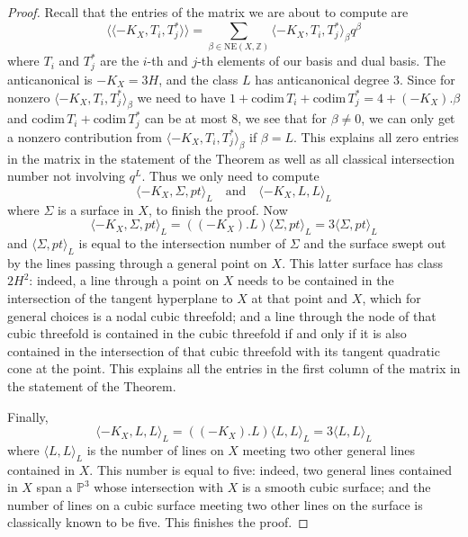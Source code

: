 \documentclass[11pt]{amsart}
\theoremstyle{plain}
\numberwithin{equation}{section}
\theoremstyle{definition}
\theoremstyle{remark}
\newcommand{\Z}{\mathbb Z}
\renewcommand{\P}{\mathbb P}
\begin{document}
\begin{proof}
Recall that the entries of the matrix we are about to compute are
\[
\langle\langle -K_X, T_i, T_j^* \rangle \rangle = \sum_{\beta \in \mathrm{NE}(X, \Z)} \langle -K_X, T_i, T_j^* \rangle_{\beta} q^\beta
\]
where $T_i$ and $T_j^*$ are the $i$-th and $j$-th elements of our basis and dual basis. The anticanonical is $-K_X =3H$, and the class $L$ has anticanonical degree $3$. Since for nonzero $\langle -K_X, T_i, T_j^* \rangle_{\beta}$ we need to have $1 + \mathrm{codim}\, T_i + \mathrm{codim}\, T_j^* = 4 + (-K_X).\beta$ and $\mathrm{codim}\, T_i + \mathrm{codim}\, T_j^*$ can be at most $8$, we see that for $\beta \neq 0$, we can only get a nonzero contribution from $\langle -K_X, T_i, T_j^* \rangle_{\beta}$  if $\beta = L$. This explains all zero entries in the matrix in the statement of the Theorem as well as all classical intersection number not involving $q^L$. Thus we only need to compute 
\[
\langle -K_X, \Sigma , pt  \rangle_{L } \quad \mathrm{and} \quad \langle -K_X, L , L \rangle_{L }
\]
where $\Sigma$ is a surface in $X$, to finish the proof. Now
\[
\langle -K_X, \Sigma , pt  \rangle_{L } = ((-K_X).L) \langle \Sigma , pt  \rangle_{L } = 3 \langle \Sigma , pt  \rangle_{L } 
\]
and $\langle \Sigma , pt  \rangle_{L }$ is equal to the intersection number of $\Sigma$ and the surface swept out by the lines passing through a general point on $X$. This latter surface has class $2H^2$: indeed, a line through a point on $X$ needs to be contained in the intersection of the tangent hyperplane to $X$ at that point and $X$, which for general choices is a nodal cubic threefold; and a line through the node of that cubic threefold is contained in the cubic threefold if and only if it is also contained in the intersection of that cubic threefold with its tangent quadratic cone at the point. This explains all the entries in the first column of the matrix in the statement of the Theorem. 

Finally, 
\[
\langle -K_X, L , L  \rangle_{L } = ((-K_X).L) \langle L , L  \rangle_{L } = 3 \langle L , L  \rangle_{L } 
\]
where $\langle L , L  \rangle_{L }$ is the number of lines on $X$ meeting two other general lines contained in $X$. This number is equal to five: indeed, two general lines contained in $X$ span a $\P^3$ whose intersection with $X$ is a smooth cubic surface; and the number of lines on a cubic surface meeting two other lines on the surface is classically known to be five. This finishes the proof. 
\end{proof}
\end{document}
